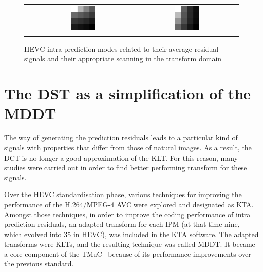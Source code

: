 \documentclass[11pt,a4paper,openright,twoside]{book}
\numberwithin{equation}{section} %
\numberwithin{figure}{section} %
\numberwithin{table}{section} %
\begin{document}
\begin{figure}[tb]
\begin{minipage}{0.48\textwidth}
\begin{tabular}[H]{ccc}
			& 
			\includegraphics[width=0.25\textwidth]{figures/coeffs-scan-horz.png}
			&
			\includegraphics[width=0.25\textwidth]{figures/coeffs-scan-vert.png}
			\\
			\color{red}{diagonal} & \color{mygreen}{horizontal} & \color{blue}{vertical} \\
		\end{tabular}
	\end{minipage}
	\caption{\acs{HEVC} intra prediction modes related to their average
	residual signals and their appropriate scanning in the transform
	domain}
	\label{fig:mdcs}
\end{figure}

\section{The \acs{DST} as a simplification of the \acs{MDDT}}
\label{sec:dst_and_mddt}

The way of generating the prediction residuals leads to a particular
kind of signals with properties that differ from those of natural
images.
As a result, the \ac{DCT} is no longer a good approximation of the
\ac{KLT}.
For this reason, many studies were carried out in order to find better
performing transform for these signals.

Over the \ac{HEVC} standardisation phase, various techniques for
improving the performance of the H.264/\acs{MPEG}-4 \acs{AVC} were
explored and designated as \ac{KTA}.
Amongst those techniques, in order to improve the coding performance of
intra prediction residuals, an adapted transform for each \ac{IPM} (at
that time nine, which evolved into 35 in \ac{HEVC}), was included in the
\ac{KTA} software.
The adapted transforms were \acp{KLT}, and the resulting technique was
called \ac{MDDT}.
It became a core component of the \ac{TMuC}~\cite{JCTVC-A204} because of
its performance improvements over the previous standard.
\end{document}
